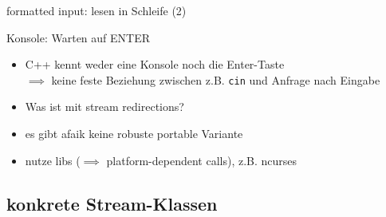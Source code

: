 \begin{frame}[t]{formatted input: lesen in Schleife (2)}
	\onslide*<+> {  }
	\onslide*<+> {  }
	\onslide<+> {  }
\end{frame}

\begin{frame}[fragile]{Konsole: Warten auf ENTER}
	\footnotesize
	\begin{itemize}
		\item C++ kennt weder eine Konsole noch die Enter-Taste	\\
			$\implies$ keine feste Beziehung zwischen z.B. \texttt{cin} und Anfrage nach Eingabe
		\item Was ist mit stream redirections?
		\item es gibt afaik keine robuste portable Variante
		\item nutze libs ($\implies$ platform-dependent calls), z.B. ncurses
	\end{itemize}
\end{frame}


\subsection{konkrete Stream-Klassen}

